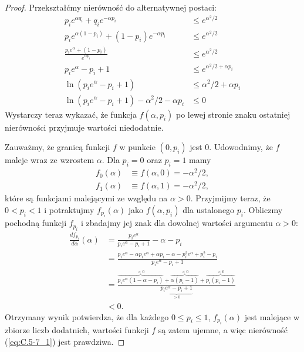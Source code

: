 \begin{proof}
	Przekształćmy nierówność do alternatywnej postaci:
	\begin{align*}
		p_ie^{\alpha q_i}+q_ie^{-\alpha p_i} &\le e^{\alpha^2\!/2} \\[1mm]
		p_ie^{\alpha(1-p_i)}+(1-p_i)e^{-\alpha p_i} &\le e^{\alpha^2\!/2} \\[2mm]
		\frac{p_ie^\alpha+(1-p_i)}{e^{\alpha p_i}} &\le e^{\alpha^2\!/2} \\[1mm]
		p_ie^\alpha-p_i+1 &\le e^{\alpha^2\!/2+\alpha p_i} \\[1mm]
		\ln(p_ie^\alpha-p_i+1) &\le \alpha^2\!/2+\alpha p_i \\[1mm]
		\ln(p_ie^\alpha-p_i+1)-\alpha^2\!/2-\alpha p_i &\le 0
	\end{align*}
	Wystarczy teraz wykazać, że funkcja $f(\alpha,p_i)$ po lewej stronie znaku ostatniej nierówności przyjmuje wartości niedodatnie.

	Zauważmy, że granicą funkcji $f$ w punkcie $(0,p_i)$ jest 0. Udowodnimy, że $f$ maleje wraz ze wzrostem $\alpha$. Dla $p_i=0$ oraz $p_i=1$ mamy
	\begin{align*}
	    f_0(\alpha) &\equiv f(\alpha,0) = -\alpha^2\!/2, \\
		f_1(\alpha) &\equiv f(\alpha,1) = -\alpha^2\!/2,
	\end{align*}
	które są funkcjami malejącymi ze względu na $\alpha>0$. Przyjmijmy teraz, że $0<p_i<1$ i potraktujmy $f_{p_i}(\alpha)$ jako $f(\alpha,p_i)$ dla ustalonego $p_i$. Obliczmy pochodną funkcji $f_{p_i}$ i zbadajmy jej znak dla dowolnej wartości argumentu $\alpha>0$:
	\begin{align*}
	    \frac{df_{p_i}}{d\alpha}(\alpha) &= \frac{p_ie^\alpha}{p_ie^\alpha-p_i+1}-\alpha-p_i \\[1mm]
		&= \frac{p_ie^\alpha-\alpha p_ie^\alpha+\alpha p_i-\alpha-p_i^2e^\alpha+p_i^2-p_i}{p_ie^\alpha-p_i+1} \\[1mm]
		&= \frac{\overbrace{p_ie^\alpha(1-\alpha-p_i)}^{<0}+\overbrace{\alpha(p_i-1)}^{<0}+\overbrace{p_i(p_i-1)}^{<0}}{\underbrace{p_ie^\alpha-p_i+1}_{>0}} \\
		&< 0.
	\end{align*}
	Otrzymany wynik potwierdza, że dla każdego $0\le p_i\le1$, $f_{p_i}(\alpha)$ jest malejące w zbiorze liczb dodatnich, wartości funkcji $f$ są zatem ujemne, a więc nierówność (\ref{eq:C.5-7_1}) jest prawdziwa.


\end{proof}

